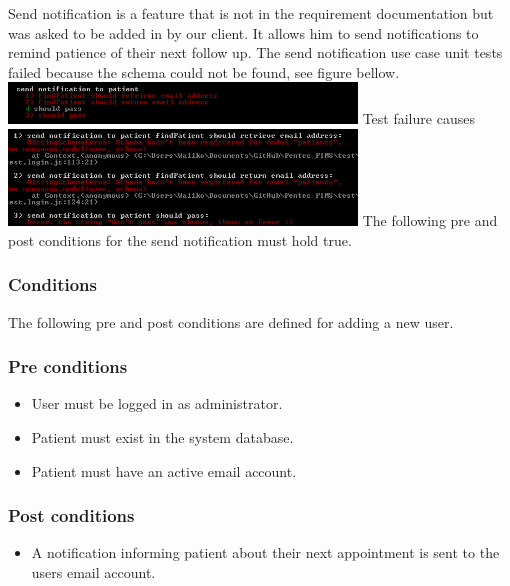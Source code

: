 Send notification is a feature that is not in the requirement documentation but was asked to be added in by our client. It allows him to send notifications to remind patience of their next follow up. 
The send notification use case unit tests failed because the schema could not be found, see figure bellow.
\newline 
\newline 
\includegraphics[width=350px]{./Graphics/SendNotification}
\newline
\newline
Test failure causes
\newline
\newline
\includegraphics[width=350px]{./Graphics/FailedTests}
\newline
\newline
The following pre and post conditions for the send notification must hold true.
		
\subsubsection*{Conditions}
The following pre and post conditions are defined for adding a new user.
	
\subsubsection*{Pre conditions}	
\begin{itemize}
		\item User must be logged in as administrator.
		\item Patient must exist in the system database.
		\item Patient must have an active email account.
\end{itemize}	

\subsubsection*{Post conditions}	
\begin{itemize}
		\item A notification informing patient about their next appointment is sent to the users email account. 
\end{itemize}	

